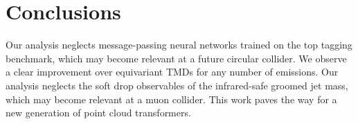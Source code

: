 \section{Conclusions}\label{sec:conclusions}

Our analysis neglects message-passing neural networks trained on the top
tagging benchmark, which may become relevant at a future circular
collider. We observe a clear improvement over equivariant TMDs for any
number of emissions. Our analysis neglects the soft drop observables of
the infrared-safe groomed jet mass, which may become relevant at a muon
collider. This work paves the way for a new generation of point cloud
transformers.

